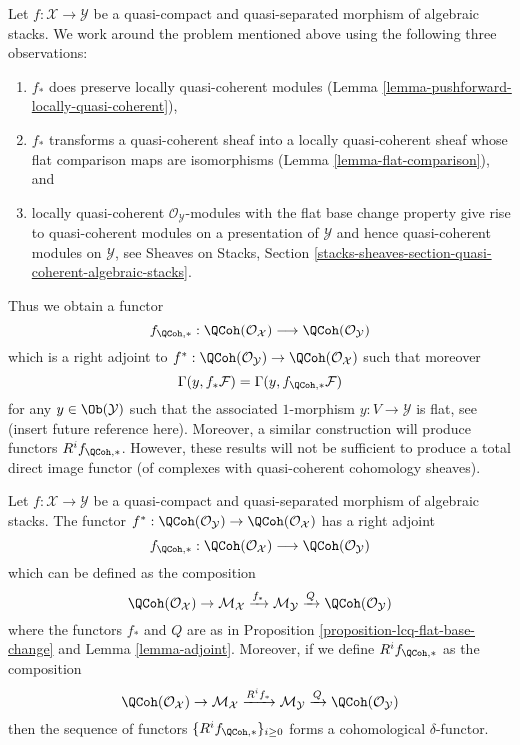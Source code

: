 \medskip\noindent
Let $f : \mathcal{X} \to \mathcal{Y}$ be a quasi-compact and
quasi-separated morphism of algebraic stacks. We work around the problem
mentioned above using the following three observations:
\begin{enumerate}
\item $f_*$ does preserve locally quasi-coherent
modules (Lemma \ref{lemma-pushforward-locally-quasi-coherent}),
\item $f_*$ transforms a quasi-coherent sheaf into a locally quasi-coherent
sheaf whose flat comparison maps are isomorphisms
(Lemma \ref{lemma-flat-comparison}), and
\item locally quasi-coherent $\mathcal{O}_\mathcal{Y}$-modules
with the flat base change property give rise to quasi-coherent
modules on a presentation of $\mathcal{Y}$ and hence quasi-coherent
modules on $\mathcal{Y}$, see
Sheaves on Stacks, Section
\ref{stacks-sheaves-section-quasi-coherent-algebraic-stacks}.
\end{enumerate}
Thus we obtain a functor
$$
f_{\QCoh, *} :
\QCoh(\mathcal{O}_\mathcal{X})
\longrightarrow
\QCoh(\mathcal{O}_\mathcal{Y})
$$
which is a right adjoint to
$f^* : \QCoh(\mathcal{O}_\mathcal{Y}) \to
\QCoh(\mathcal{O}_\mathcal{X})$
such that moreover
$$
\Gamma(y, f_*\mathcal{F}) = \Gamma(y, f_{\QCoh, *}\mathcal{F})
$$
for any $y \in \Ob(\mathcal{Y})$ such that the associated
$1$-morphism $y : V \to \mathcal{Y}$ is flat, see (insert future
reference here).
Moreover, a similar construction will produce functors
$R^if_{\QCoh, *}$.
However, these results will not be sufficient to produce a
total direct image functor (of complexes with quasi-coherent
cohomology sheaves).

\begin{proposition}
\label{proposition-direct-image-quasi-coherent}
Let $f : \mathcal{X} \to \mathcal{Y}$ be a quasi-compact and quasi-separated
morphism of algebraic stacks. The functor
$f^* : \QCoh(\mathcal{O}_\mathcal{Y}) \to
\QCoh(\mathcal{O}_\mathcal{X})$
has a right adjoint
$$
f_{\QCoh, *} :
\QCoh(\mathcal{O}_\mathcal{X})
\longrightarrow
\QCoh(\mathcal{O}_\mathcal{Y})
$$
which can be defined as the composition
$$
\QCoh(\mathcal{O}_\mathcal{X}) \to \mathcal{M}_\mathcal{X}
\xrightarrow{f_*} \mathcal{M}_\mathcal{Y}
\xrightarrow{Q} \QCoh(\mathcal{O}_\mathcal{Y})
$$
where the functors $f_*$ and $Q$ are as in
Proposition \ref{proposition-lcq-flat-base-change}
and
Lemma \ref{lemma-adjoint}.
Moreover, if we define $R^if_{\QCoh, *}$ as the composition
$$
\QCoh(\mathcal{O}_\mathcal{X}) \to \mathcal{M}_\mathcal{X}
\xrightarrow{R^if_*} \mathcal{M}_\mathcal{Y}
\xrightarrow{Q} \QCoh(\mathcal{O}_\mathcal{Y})
$$
then the sequence of functors $\{R^if_{\QCoh, *}\}_{i \geq 0}$
forms a cohomological $\delta$-functor.
\end{proposition}


